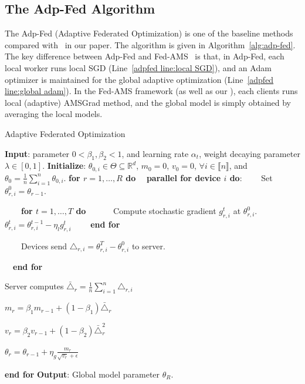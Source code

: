 \documentclass[manuscript,screen,review]{acmart}
\begin{document}
\subsection{The Adp-Fed Algorithm~\citep{reddi2020adaptive}}

The Adp-Fed (Adaptive Federated Optimization) is one of the baseline methods compared with \algo\ in our paper. The algorithm is given in Algorithm~\ref{alg:adp-fed}. The key difference between Adp-Fed and Fed-AMS~\citep{chen2020toward} is that, in Adp-Fed, each local worker runs local SGD (Line~\ref{adpfed line:local SGD}), and an Adam optimizer is maintained for the global adaptive optimization (Line~\ref{adpfed line:global adam}). In the Fed-AMS framework (as well as our \algo), each clients runs local (adaptive) AMSGrad method, and the global model is simply obtained by averaging the local models.


\begin{algorithm}[H]
\caption{Adaptive Federated Optimization~\citep{reddi2020adaptive}} \label{alg:adp-fed}
\begin{algorithmic}[1]
\STATE \textbf{Input}: parameter $0< \beta_1, \beta_2 <1$, and learning rate $\alpha_t$, weight decaying parameter $\lambda \in [0,1]$.
\STATE \textbf{Initialize}: $\theta_{0,i} \in \Theta \subseteq \mathbb R^d $, $m_0=0$, $v_{0} =0$, $\forall i\in \llbracket n\rrbracket$, and $\theta_0 =  \frac{1}{n} \sum_{i=1}^n \theta_{0,i}$.
\vspace{0.05in}
\STATE \textbf{for $r=1, \ldots, R$ do}
\STATE $\quad$\textbf{parallel for device $i$ do}:
\STATE $\qquad$Set $\theta_{r,i}^{0} = \theta_{r-1}$.

\STATE $\qquad$\textbf{for $t=1, \ldots, T$ do}
\STATE $\qquad\quad$Compute stochastic gradient $g^t_{r,i}$ at $\theta_{r,i}^{0}$.
\STATE $\qquad\quad$$\theta_{r,i}^t=\theta_{r,i}^{t-1}-\eta_l g_{r,i}^t$ \label{adpfed line:local SGD} 
\STATE $\qquad$\textbf{end for}


\STATE $\qquad$Devices send $\triangle_{r,i}=\theta_{r,i}^T-\theta_{r,i}^0$ to server.

\STATE $\quad$\textbf{end for}

\STATE \quad Server computes $\bar{\triangle}_r = \frac{1}{n}\sum_{i=1}^n \triangle_{r,i}$

\STATE \quad $m_r = \beta_1 m_{r-1} + (1-\beta_1)\bar{\triangle}_r$

\STATE \quad $v_r = \beta_2 v_{r-1} + (1-\beta_2)\bar{\triangle}_r^2$

\STATE \quad $\theta_r = \theta_{r-1}+\eta_g\frac{m_r}{\sqrt{v_r}+\epsilon}$ \label{adpfed line:global adam}

\STATE \textbf{end for}
\STATE \textbf{Output}: Global model parameter $\theta_R$.
\end{algorithmic}
\end{algorithm}
\end{document}
